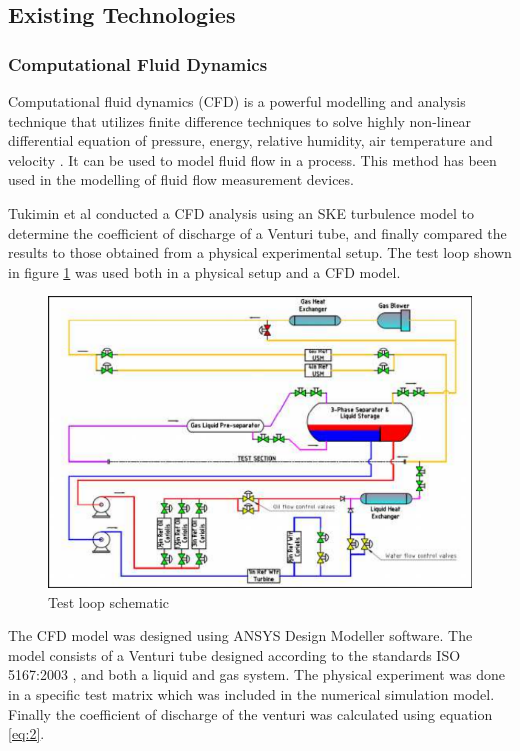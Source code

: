 \subsection{Existing Technologies}
\subsubsection{Computational Fluid Dynamics}
Computational fluid dynamics (CFD) is a powerful modelling and analysis technique that utilizes finite difference techniques to solve highly non-linear differential equation of pressure, energy, relative humidity, air temperature and velocity \cite{kuntz2009pre}. It can be used to model fluid flow in a process. This method has been used in the modelling of fluid flow measurement devices.
\par
Tukimin et al \cite{tukimin2016cfd} conducted a CFD analysis using an \ac{SKE} turbulence model to determine the coefficient of discharge of a Venturi tube, and finally compared the results to those obtained from a physical experimental setup. The test loop shown in figure \ref{fig:test_loop_rig} was used both in a physical setup and a CFD model. 

\begin{figure}[ht]
\includegraphics[width=0.9\linewidth]{Figures/test_loop.png}
\centering
\caption{ Test loop schematic \cite{tukimin2016cfd}}
\label{fig:test_loop_rig}
\end{figure}

The CFD model was designed using ANSYS Design Modeller software. The model consists of a Venturi tube designed according to the standards ISO 5167:2003 \cite{iso20035167}, and both a liquid and gas system. The physical experiment was done in a specific test matrix which was included in the numerical simulation model. Finally the coefficient of discharge of the venturi was calculated using equation \ref{eq:2}.  

